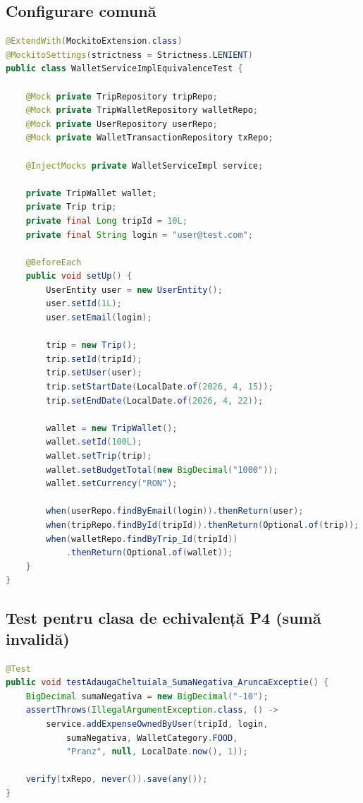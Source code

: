 \subsection{Configurare comună}

\begin{lstlisting}[language=Java, caption={Schelet din \texttt{...EquivalenceTest.java}}]
@ExtendWith(MockitoExtension.class)
@MockitoSettings(strictness = Strictness.LENIENT)
public class WalletServiceImplEquivalenceTest {

    @Mock private TripRepository tripRepo;
    @Mock private TripWalletRepository walletRepo;
    @Mock private UserRepository userRepo;
    @Mock private WalletTransactionRepository txRepo;

    @InjectMocks private WalletServiceImpl service;

    private TripWallet wallet;
    private Trip trip;
    private final Long tripId = 10L;
    private final String login = "user@test.com";

    @BeforeEach
    public void setUp() {
        UserEntity user = new UserEntity();
        user.setId(1L);
        user.setEmail(login);

        trip = new Trip();
        trip.setId(tripId);
        trip.setUser(user);
        trip.setStartDate(LocalDate.of(2026, 4, 15));
        trip.setEndDate(LocalDate.of(2026, 4, 22));

        wallet = new TripWallet();
        wallet.setId(100L);
        wallet.setTrip(trip);
        wallet.setBudgetTotal(new BigDecimal("1000"));
        wallet.setCurrency("RON");

        when(userRepo.findByEmail(login)).thenReturn(user);
        when(tripRepo.findById(tripId)).thenReturn(Optional.of(trip));
        when(walletRepo.findByTrip_Id(tripId))
            .thenReturn(Optional.of(wallet));
    }
}
\end{lstlisting}

\subsection{Test pentru clasa de echivalență P4 (sumă invalidă)}

\begin{lstlisting}[language=Java]
@Test
public void testAdaugaCheltuiala_SumaNegativa_AruncaExceptie() {
    BigDecimal sumaNegativa = new BigDecimal("-10");
    assertThrows(IllegalArgumentException.class, () ->
        service.addExpenseOwnedByUser(tripId, login,
            sumaNegativa, WalletCategory.FOOD,
            "Pranz", null, LocalDate.now(), 1));

    verify(txRepo, never()).save(any());
}
\end{lstlisting}

